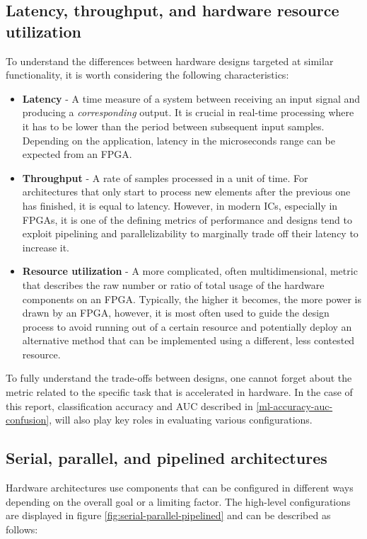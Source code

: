 \subsection{Latency, throughput, and hardware resource utilization}\label{latency-throughput-resources}
To understand the differences between hardware designs targeted at similar functionality, it is worth considering the following characteristics:

\begin{itemize}
  \item \textbf{Latency} - A time measure of a system between receiving an input signal and producing a \textit{corresponding} output. It is crucial in real-time processing where it has to be lower than the period between subsequent input samples. Depending on the application, latency in the microseconds range can be expected from an FPGA.
  \item \textbf{Throughput} - A rate of samples processed in a unit of time. For architectures that only start to process new elements after the previous one has finished, it is equal to latency. However, in modern ICs, especially in FPGAs, it is one of the defining metrics of performance and designs tend to exploit pipelining and parallelizability to marginally trade off their latency to increase it.
  \item \textbf{Resource utilization} - A more complicated, often multidimensional, metric that describes the raw number or ratio of total usage of the hardware components on an FPGA. Typically, the higher it becomes, the more power is drawn by an FPGA, however, it is most often used to guide the design process to avoid running out of a certain resource and potentially deploy an alternative method that can be implemented using a different, less contested resource.
\end{itemize}

To fully understand the trade-offs between designs, one cannot forget about the metric related to the specific task that is accelerated in hardware. In the case of this report, classification accuracy and AUC described in \autoref{ml-accuracy-auc-confusion}, will also play key roles in evaluating various configurations.


\subsection{Serial, parallel, and pipelined architectures}\label{serial-parallel-pipelined}
Hardware architectures use components that can be configured in different ways depending on the overall goal or a limiting factor. The high-level configurations  are displayed in figure \ref{fig:serial-parallel-pipelined} and can be described as follows:

